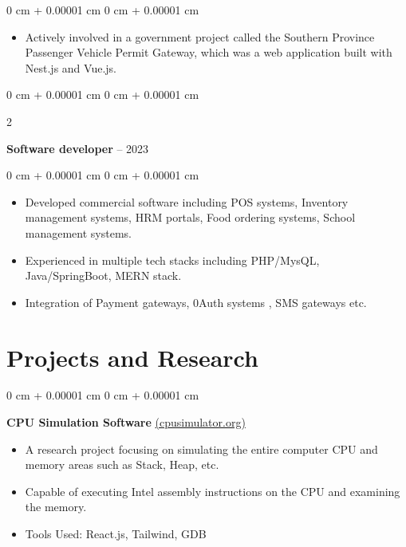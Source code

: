 \documentclass[10pt, letterpaper]{article}
\newenvironment{highlights}{
    \begin{itemize}[
        topsep=0.10 cm,
        parsep=0.10 cm,
        partopsep=0pt,
        itemsep=0pt,
        leftmargin=0 cm + 10pt
    ]
}{
    \end{itemize}
} %
\newenvironment{onecolentry}{
    \begin{adjustwidth}{
        0 cm + 0.00001 cm
    }{
        0 cm + 0.00001 cm
    }
}{
    \end{adjustwidth}
} %
\newenvironment{twocolentry}[2][]{
    \onecolentry
    \def\secondColumn{#2}
    \setcolumnwidth{\fill, 4.5 cm}
    \begin{paracol}{2}
}{
    \switchcolumn \raggedleft \secondColumn
    \end{paracol}
    \endonecolentry
} %
\let\hrefWithoutArrow\href
\begin{document}
        \vspace{0.10 cm}
        \begin{onecolentry}
            \begin{highlights}
                \item Actively involved in a government project called the Southern Province Passenger Vehicle Permit Gateway, which was a web application built with Nest.js and Vue.js. 
            \end{highlights}
        \end{onecolentry}

        \vspace{0.2 cm}



        \begin{twocolentry}{
            2012 – 2023
        }
            \textbf{Software developer}\end{twocolentry}

        \vspace{0.10 cm}
        \begin{onecolentry}
            \begin{highlights}

    \item Developed commercial software including POS systems, Inventory management systems, HRM portals, Food ordering systems, School management systems.
    \item Experienced in multiple tech stacks including PHP/MysQL, Java/SpringBoot, MERN stack. 
    
    \item Integration of Payment gateways, 0Auth systems , SMS gateways etc.

            \end{highlights}
        \end{onecolentry}






\section{Projects and Research}

    \begin{onecolentry}
    \textbf{CPU Simulation Software} {\hrefWithoutArrow{https://cpusimulator.org/}{(cpusimulator.org)}}
        \vspace{0.10 cm}
        \begin{highlights}
            \item A research project focusing on simulating the entire computer CPU and memory areas such as Stack, Heap, etc.
            \item Capable of executing Intel assembly instructions on the CPU and examining the memory.
            \item Tools Used: React.js, Tailwind, GDB
        \end{highlights}
    \end{onecolentry}
\end{document}
